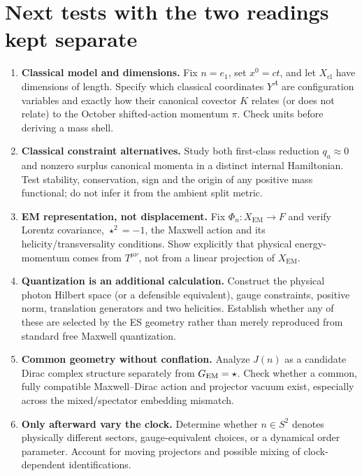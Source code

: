\documentclass[10.5pt,a4paper]{article}
\newcommand{\Xcl}{X_{\mathrm{cl}}}
\newcommand{\Xem}{X_{\mathrm{EM}}}
\begin{document}
\section{Next tests with the two readings kept separate}
\begin{enumerate}
 \item \textbf{Classical model and dimensions.} Fix $n=e_1$, set $x^0=ct$, and let $\Xcl$ have dimensions of length. Specify which classical coordinates $Y^A$ are configuration variables and exactly how their canonical covector $K$ relates (or does not relate) to the October shifted-action momentum $\pi$. Check units before deriving a mass shell.
 \item \textbf{Classical constraint alternatives.} Study both first-class reduction $q_a\approx0$ and nonzero surplus canonical momenta in a distinct internal Hamiltonian. Test stability, conservation, sign and the origin of any positive mass functional; do not infer it from the ambient split metric.
 \item \textbf{EM representation, not displacement.} Fix $\Phi_n:\Xem\to F$ and verify Lorentz covariance, $\star^2=-1$, the Maxwell action and its helicity/transversality conditions. Show explicitly that physical energy-momentum comes from $T^{\mu\nu}$, not from a linear projection of $\Xem$.
 \item \textbf{Quantization is an additional calculation.} Construct the physical photon Hilbert space (or a defensible equivalent), gauge constraints, positive norm, translation generators and two helicities. Establish whether any of these are selected by the ES geometry rather than merely reproduced from standard free Maxwell quantization.
 \item \textbf{Common geometry without conflation.} Analyze $J(n)$ as a candidate Dirac complex structure separately from $G_{\rm EM}=\star$. Check whether a common, fully compatible Maxwell--Dirac action and projector vacuum exist, especially across the mixed/spectator embedding mismatch.
 \item \textbf{Only afterward vary the clock.} Determine whether $n\in S^2$ denotes physically different sectors, gauge-equivalent choices, or a dynamical order parameter. Account for moving projectors and possible mixing of clock-dependent identifications.
\end{enumerate}
\end{document}
